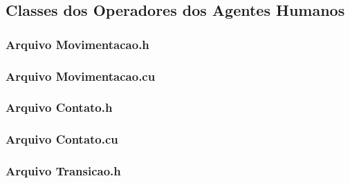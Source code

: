 


\newpage

\subsection{Classes dos Operadores dos Agentes Humanos}

\subsubsection{Arquivo Movimentacao.h}



\newpage

\subsubsection{Arquivo Movimentacao.cu}



\newpage

\subsubsection{Arquivo Contato.h}



\newpage

\subsubsection{Arquivo Contato.cu}



\newpage

\subsubsection{Arquivo Transicao.h}



